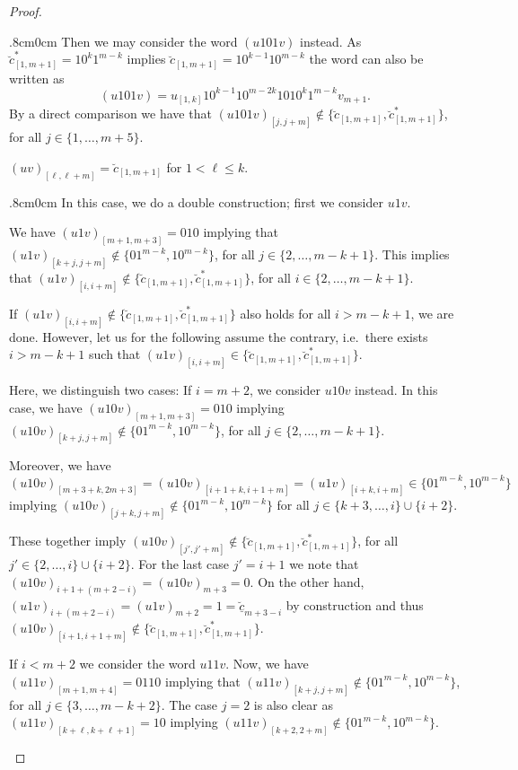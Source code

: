 \documentclass[11pt,reqno]{amsart}
\theoremstyle{plain}
\theoremstyle{definition}
\begin{document}
\begin{proof}
\begin{adjustwidth}{.8cm}{0cm}
Then we may consider the word $(u101v)$ instead.
As $\breve{c}^\ast_{[1,m+1]}=10^{k}1^{m-k}$ implies 
$\breve{c}_{[1,m+1]}=10^{k-1}10^{m-k}$
the word can also be written as 
$$(u101v)=u_{[1,k]}10^{k-1}10^{m-2k}1010^k1^{m-k}v_{m+1}.$$
By a direct comparison we have that 
$(u101v)_{[j,j+m]}\notin \{\breve{c}_{[1,m+1]}, \breve{c}^\ast_{[1,m+1]}\}$, 
for all 
$j\in \{1,\ldots, m+5\}$.
\end{adjustwidth}


$(uv)_{[\ell,\ell+m]}=\breve{c}_{[1,m+1]}$ for 
 $1<\ell\leqslant k$.
 

\begin{adjustwidth}{.8cm}{0cm} 
In this case, we do a double construction; first we consider $u1v$. 

We have $(u1v)_{[m+1,m+3]}=010$ implying that 
$(u1v)_{[k+j,j+m]}\notin\{01^{m-k}, 10^{m-k}\}$, for all $j\in\{ 2, \ldots, m-k+1\}$. 
This implies that 
$(u1v)_{[i,i+m]}\notin \{\breve{c}_{[1,m+1]}, \breve{c}^\ast_{[1,m+1]}\}$, 
for all 
$i\in \{ 2, \ldots, m-k+1\}$.

If $(u1v)_{[i,i+m]}\notin\{\breve{c}_{[1,m+1]},\breve{c}^\ast_{[1,m+1]}\}$ also holds for all $i> m-k+1$, we are done. 
However, let us for the following assume the contrary, i.e.\ there exists $i>m-k+1$ such that 
$(u1v)_{[i,i+m]}\in\{\breve{c}_{[1,m+1]}, \breve{c}^\ast_{[1,m+1]}\}$. 

Here, we distinguish two cases: If $i=m+2$, we consider 
$u 10v$ instead.
In this case, we have $(u10v)_{[m+1,m+3]}=010$ implying 
$(u10v)_{[k+j,j+m]}\notin\{01^{m-k}, 10^{m-k}\}$, for all $j\in\{ 2, \ldots, m-k+1\}$. 

Moreover, we have 
$$(u10v)_{[m+3+k,2m+3]}=(u10v)_{[i+1+k,i+1+m]}=(u1v)_{[i+k,i+m]}\in \{01^{m-k},10^{m-k}\}$$ 
implying $(u10v)_{[j+k,j+m]}\notin \{01^{m-k},10^{m-k}\}$ for all $j\in \{k+3,\ldots, i\}\cup \{i+2\}$.

These together imply 
$(u10v)_{[j',j'+m]}\notin \{\breve{c}_{[1,m+1]}, \breve{c}^\ast_{[1,m+1]}\}$, 
for all 
$j'\in \{ 2, \ldots, i\}\cup \{i+2\}$.
For the last case $j'=i+1$ we note that 
$(u10v)_{i+1+ (m+2-i)}=(u10v)_{m+3}=0$. On the other hand, 
$(u1v)_{i+(m+2-i)}=(u1v)_{m+2}=1=\underline{\breve{c}}_{m+3-i}$ by construction and thus $(u10v)_{[i+1,i+1+m]}\notin \{\breve{c}_{[1,m+1]}, \breve{c}^\ast_{[1,m+1]}\}$.






If $i<m+2$ we consider the word $u 11v$.
Now, we have $(u11v)_{[m+1,m+4]}=0110$ implying that 
$(u11v)_{[k+j,j+m]}\notin\{01^{m-k}, 10^{m-k}\}$, for all $j\in\{ 3, \ldots, m-k+2\}$. 
The case $j=2$ is also clear as $(u11v)_{[k+\ell,k+\ell+1]}=10$
implying $(u11v)_{[k+2,2+m]}\notin\{01^{m-k}, 10^{m-k}\}$.


\end{adjustwidth}
\end{proof}
\end{document}
